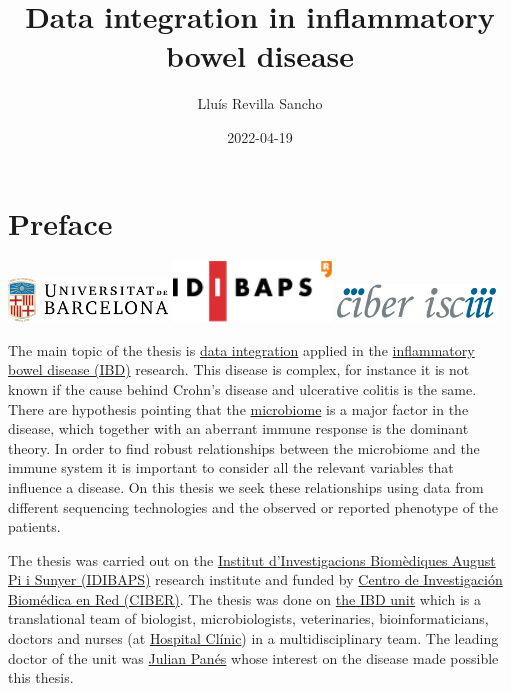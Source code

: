 \documentclass[
  12pt,
  a4paper,
  twoside,
  openright]{book}
\title{Data integration in inflammatory bowel disease}
\author{Lluís Revilla Sancho}
\date{2022-04-19}
\begin{document}
\maketitle

{
\hypersetup{linkcolor=}
\setcounter{tocdepth}{2}
\tableofcontents
}
\listoffigures
\listoftables
\hypertarget{preface}{%
\chapter*{Preface}\label{preface}}

\includegraphics[width=1.66667in,height=\textheight]{images/ub_logo.png} \includegraphics[width=1.66667in,height=\textheight]{images/idibaps_logo.png} \includegraphics[width=1.66667in,height=0.39583in]{images/logo_ciber.png}

The main topic of the thesis is \href{https://en.wikipedia.org/wiki/Data_integration}{data integration} applied in the \href{https://en.wikipedia.org/wiki/Inflammatory_bowel_disease}{inflammatory bowel disease (IBD)} research.
This disease is complex, for instance it is not known if the cause behind Crohn's disease and ulcerative colitis is the same.
There are hypothesis pointing that the \href{https://en.wikipedia.org/wiki/Microbiota}{microbiome} is a major factor in the disease, which together with an aberrant immune response is the dominant theory.
In order to find robust relationships between the microbiome and the immune system it is important to consider all the relevant variables that influence a disease.
On this thesis we seek these relationships using data from different sequencing technologies and the observed or reported phenotype of the patients.

The thesis was carried out on the \href{http://www.idibaps.org/}{Institut d'Investigacions Biomèdiques August Pi i Sunyer (IDIBAPS)} research institute and funded by \href{https://www.ciberehd.org/}{Centro de Investigación Biomédica en Red (CIBER)}.
The thesis was done on \href{https://www.ibd-bcn.org/}{the IBD unit} which is a translational team of biologist, microbiologists, veterinaries, bioinformaticians, doctors and nurses (at \href{https://www.clinicbarcelona.org/en}{Hospital Clínic}) in a multidisciplinary team.
The leading doctor of the unit was \href{https://orcid.org/0000-0002-4971-6902}{Julian Panés} whose interest on the disease made possible this thesis.
\end{document}

